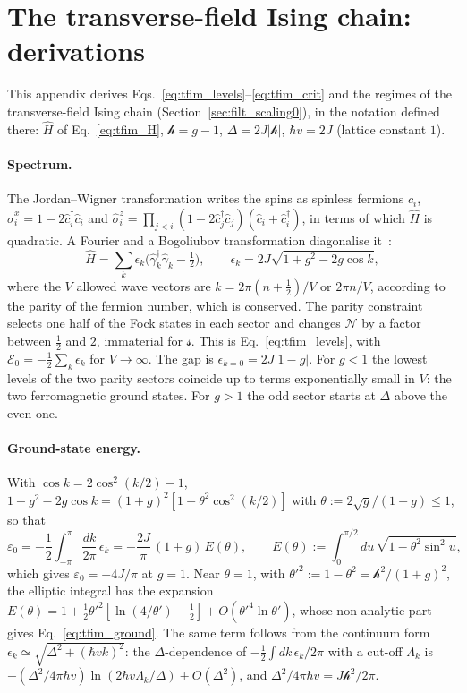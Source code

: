 \documentclass[10pt,a4paper]{article}
\theoremstyle{plain}
\newcommand{\cN}{\mathcal{N}}   %
\newcommand{\hfield}{\mathscr{h}}  %
\newcommand{\enrg}{\mathcal{E}}  %
\newcommand{\lds}{\mathscr{s}}  %
\begin{document}
\section{The transverse-field Ising chain: derivations}
\label{app:tfim}

This appendix derives Eqs.~\eqref{eq:tfim_levels}--\eqref{eq:tfim_crit} and
the regimes of the transverse-field Ising chain
(Section~\ref{sec:filt_scaling0}), in the notation defined there:
$\hat H$ of Eq.~\eqref{eq:tfim_H}, $\hfield=g-1$, $\Delta=2J|\hfield|$,
$\hbar v=2J$ (lattice constant $1$).

\paragraph{Spectrum.} The Jordan--Wigner transformation writes the spins as
spinless fermions $\hat c_i$, $\hat\sigma^{x}_i=1-2\hat c^\dagger_i\hat c_i$
and $\hat\sigma^{z}_i=\prod_{j<i}(1-2\hat c^\dagger_j\hat c_j)(\hat c_i+\hat c^\dagger_i)$,
in terms of which $\hat H$ is quadratic. A Fourier and a Bogoliubov
transformation diagonalise it~\cite{LSM1961,Pfeuty1970,Sachdev2011}:
\[
  \hat H=\sum_k\epsilon_k\Big(\hat\gamma^\dagger_k\hat\gamma_k-\tfrac12\Big) ,
  \qquad
  \epsilon_k=2J\sqrt{1+g^{2}-2g\cos k} ,
\]
where the $V$ allowed wave vectors are $k=2\pi(n+\tfrac12)/V$ or $2\pi n/V$,
according to the parity of the fermion number, which is conserved. The
parity constraint selects one half of the Fock states in each sector and
changes $\cN$ by a factor between $\tfrac12$ and $2$, immaterial for
$\lds$. This is Eq.~\eqref{eq:tfim_levels}, with
$\enrg_0=-\tfrac12\sum_k\epsilon_k$ for $V\to\infty$. The gap is
$\epsilon_{k=0}=2J|1-g|$. For $g<1$ the lowest levels of the two parity
sectors coincide up to terms exponentially small in $V$: the two
ferromagnetic ground states. For $g>1$ the odd sector starts at $\Delta$
above the even one.

\paragraph{Ground-state energy.} With $\cos k=2\cos^{2}(k/2)-1$,
$1+g^{2}-2g\cos k=(1+g)^{2}[1-\theta^{2}\cos^{2}(k/2)]$ with
$\theta:=2\sqrt g/(1+g)\le1$, so that
\[
  \varepsilon_0=-\frac{1}{2}\int_{-\pi}^{\pi}\frac{dk}{2\pi}\,\epsilon_k
  =-\frac{2J}{\pi}\,(1+g)\,E(\theta) ,
  \qquad
  E(\theta):=\int_0^{\pi/2}du\,\sqrt{1-\theta^{2}\sin^{2}u} ,
\]
which gives $\varepsilon_0=-4J/\pi$ at $g=1$. Near $\theta=1$, with
$\theta'^{2}:=1-\theta^{2}=\hfield^{2}/(1+g)^{2}$, the elliptic integral has
the expansion
$E(\theta)=1+\tfrac12\theta'^{2}[\ln(4/\theta')-\tfrac12]+O(\theta'^{4}\ln\theta')$,
whose non-analytic part gives Eq.~\eqref{eq:tfim_ground}. The same term
follows from the continuum form $\epsilon_k\simeq\sqrt{\Delta^{2}+(\hbar vk)^{2}}$:
the $\Delta$-dependence of $-\tfrac12\int dk\,\epsilon_k/2\pi$ with a
cut-off $\Lambda_k$ is
$-(\Delta^{2}/4\pi\hbar v)\ln(2\hbar v\Lambda_k/\Delta)+O(\Delta^{2})$, and
$\Delta^{2}/4\pi\hbar v=J\hfield^{2}/2\pi$.
\end{document}
